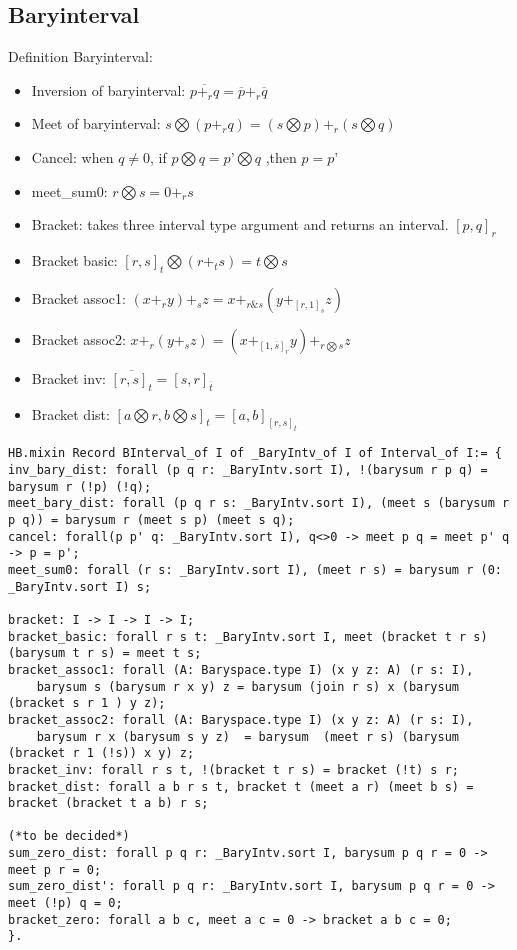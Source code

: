 \documentclass[a4paper,10pt]{article} %
\begin{document}
\subsection{Baryinterval}
Definition Baryinterval:
\begin{itemize}
    \item Inversion of baryinterval: $\overline{p +_rq} = \overline{p} + _r\overline{q}$
    \item Meet of baryinterval: $s \bigotimes (p +_rq) = (s \bigotimes p) + _r(s \bigotimes q)$
    \item Cancel: when $q \neq 0$, if $p \bigotimes q = p’ \bigotimes q$ ,then $p = p’$
    \item meet\_sum0: $r \bigotimes s = 0 + _rs$
    \item Bracket: takes three interval type argument and returns an interval. $[p, q]_r$
    \item Bracket basic: $[r, s]_t \bigotimes (r + _ts) = t \bigotimes s$
    \item Bracket assoc1: $(x +_ry) + _sz = x + _{r \& s}(y + _{[r, 1]_s}z)$
    \item Bracket assoc2: $x + _r(y + _sz) = (x + _{[1, \overline{s}]_r}y)+ _{r \bigotimes s}z$
    \item Bracket inv: $\overline{[r, s]_t} = [s, r]_{\overline{t}}$
    \item Bracket dist: $[a \bigotimes r, b \bigotimes s]_t = [a, b]_{[r, s]_t}$
\end{itemize}
\begin{lstlisting}
HB.mixin Record BInterval_of I of _BaryIntv_of I of Interval_of I:= {
inv_bary_dist: forall (p q r: _BaryIntv.sort I), !(barysum r p q) = barysum r (!p) (!q);
meet_bary_dist: forall (p q r s: _BaryIntv.sort I), (meet s (barysum r p q)) = barysum r (meet s p) (meet s q);
cancel: forall(p p' q: _BaryIntv.sort I), q<>0 -> meet p q = meet p' q -> p = p';
meet_sum0: forall (r s: _BaryIntv.sort I), (meet r s) = barysum r (0: _BaryIntv.sort I) s;

bracket: I -> I -> I -> I;
bracket_basic: forall r s t: _BaryIntv.sort I, meet (bracket t r s) (barysum t r s) = meet t s;
bracket_assoc1: forall (A: Baryspace.type I) (x y z: A) (r s: I),
    barysum s (barysum r x y) z = barysum (join r s) x (barysum (bracket s r 1 ) y z);
bracket_assoc2: forall (A: Baryspace.type I) (x y z: A) (r s: I),
    barysum r x (barysum s y z)  = barysum  (meet r s) (barysum (bracket r 1 (!s)) x y) z;
bracket_inv: forall r s t, !(bracket t r s) = bracket (!t) s r;
bracket_dist: forall a b r s t, bracket t (meet a r) (meet b s) = bracket (bracket t a b) r s;

(*to be decided*)
sum_zero_dist: forall p q r: _BaryIntv.sort I, barysum p q r = 0 -> meet p r = 0;
sum_zero_dist': forall p q r: _BaryIntv.sort I, barysum p q r = 0 -> meet (!p) q = 0;
bracket_zero: forall a b c, meet a c = 0 -> bracket a b c = 0;
}.
\end{lstlisting}
\end{document}
